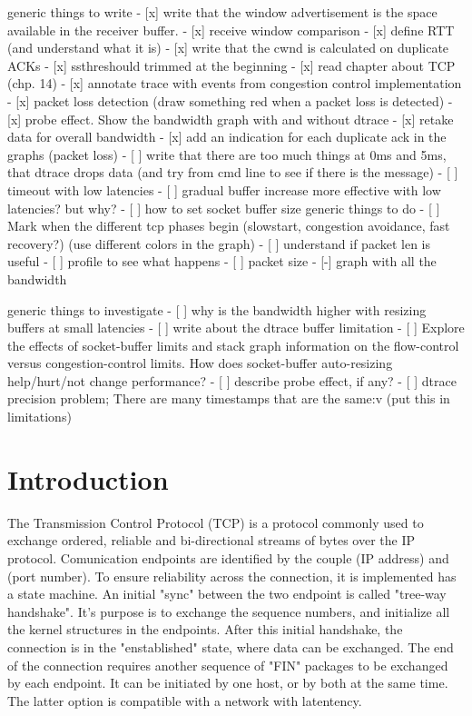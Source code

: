 \documentclass[a4paper,10pt]{article}
\begin{document}
generic things to write
- [x] write that the window advertisement is the space available in the receiver buffer.
- [x] receive window comparison
- [x] define RTT (and understand what it is)
- [x] write that the cwnd is calculated on duplicate ACKs
- [x] ssthreshould trimmed at the beginning
- [x] read chapter about TCP (chp. 14)
- [x] annotate trace with events from congestion control implementation
- [x] packet loss detection (draw something red when a packet loss is detected)
- [x] probe effect. Show the bandwidth graph with and without dtrace
- [x] retake data for overall bandwidth
- [x] add an indication for each duplicate ack in the graphs (packet loss)
- [ ] write that there are too much things at 0ms and 5ms, that dtrace drops data (and try from cmd line to see if there is the message)
- [ ] timeout with low latencies
- [ ] gradual buffer increase more effective with low latencies? but why?
- [ ] how to set socket buffer size
generic things to do 
- [ ] Mark when  the different tcp phases begin (slowstart, congestion avoidance, fast recovery?) (use different colors in the graph)
- [ ] understand if packet len is useful
- [ ] profile to see what happens
- [ ] packet size
- [-] graph with all the bandwidth

generic things to investigate
- [ ] why is the bandwidth higher with resizing buffers at small latencies
- [ ] write about the dtrace buffer limitation
- [ ] Explore the effects of socket-buffer limits and stack graph information on the flow-control versus congestion-control limits. How does socket-buffer auto-resizing help/hurt/not change performance? 
- [ ] describe probe effect, if any?
- [ ] dtrace precision problem; There are many timestamps that are the same:v (put this in limitations)
\fi

\clearpage

\setcounter{page}{1}

\section{Introduction}

The Transmission Control Protocol (TCP) is a protocol commonly used to exchange ordered, reliable and bi-directional streams of bytes over the IP protocol. Comunication endpoints are identified by the couple (IP address) and (port number). 
To ensure reliability across the connection, it is implemented has a state machine. An initial "sync" between the two endpoint is called "tree-way handshake". It's purpose is to exchange the sequence numbers, and initialize all the kernel structures in the endpoints.
After this initial handshake, the connection is in the "enstablished" state, where data can be exchanged.
The end of the connection requires another sequence of "FIN" packages to be exchanged by each endpoint. It can be initiated by one host, or by both at the same time. The latter option is compatible with a network with latentency.
\end{document}

